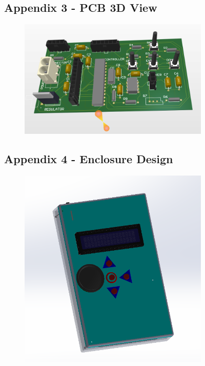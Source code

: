 \documentclass[11pt]{article}
\begin{document}
\begin{figure}
\subsection{Appendix 3 - PCB 3D View}
    \begin{subfigure}{\textwidth}
    \centering
    \includegraphics[width=1\textwidth]{Images/3D.png}
    \end{subfigure}

\subsection{Appendix 4 - Enclosure Design}
    \begin{subfigure}{\textwidth}
    \centering
    \includegraphics[height=0.7\textwidth]{Images/encl full.png}
    \end{subfigure}
\end{figure}
\end{document}
